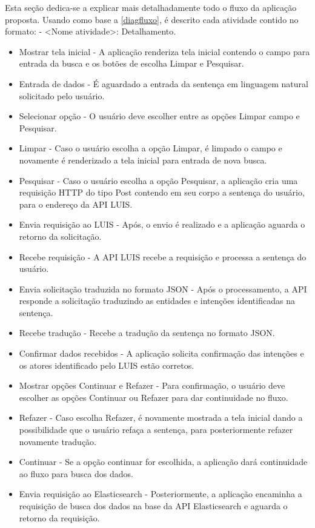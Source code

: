 Esta seção dedica-se a explicar mais detalhadamente todo o fluxo da aplicação proposta. Usando como base a \autoref{diagfluxo}, é descrito cada atividade contido no formato: - <Nome atividade>: Detalhamento.

\clearpage
\begin{itemize}
	\item Mostrar tela inicial - A aplicação renderiza tela inicial contendo o campo para entrada da busca e os botões de escolha Limpar e Pesquisar.
	\item Entrada de dados - É aguardado a entrada da sentença em linguagem natural solicitado pelo usuário.
	\item Selecionar opção - O usuário deve escolher entre as opções Limpar campo e Pesquisar.
	\item Limpar - Caso o usuário escolha a opção Limpar, é limpado o campo e novamente é renderizado a tela inicial para entrada de nova busca.
	\item Pesquisar - Caso o usuário escolha a opção Pesquisar, a aplicação cria uma requisição HTTP do tipo Post contendo em seu corpo a sentença do usuário, para o endereço da API LUIS.
	\item Envia requisição ao LUIS - Após, o envio é realizado e a aplicação aguarda o retorno da solicitação.
	\item Recebe requisição - A API LUIS recebe a requisição e processa a sentença do usuário.
	\item Envia solicitação traduzida no formato JSON - Após o processamento, a API responde a solicitação traduzindo as entidades e intenções identificadas na sentença.
	\item Recebe tradução - Recebe a tradução da sentença no formato JSON.
	\item Confirmar dados recebidos - A aplicação solicita confirmação das intenções e os atores identificado pelo LUIS estão corretos.
	\item Mostrar opções Continuar e Refazer - Para confirmação, o usuário deve escolher as opções Continuar ou Refazer para dar continuidade no fluxo.
	\item Refazer - Caso escolha Refazer, é novamente mostrada a tela inicial dando a possibilidade que o usuário refaça a sentença, para posteriormente refazer novamente tradução.
	\item Continuar - Se a opção continuar for escolhida, a aplicação dará continuidade ao fluxo para busca dos dados.
	\item Envia requisição ao Elasticsearch - Posteriormente, a aplicação encaminha a requisição  de busca dos dados na base da API Elasticsearch e aguarda o retorno da requisição.

\end{itemize}
